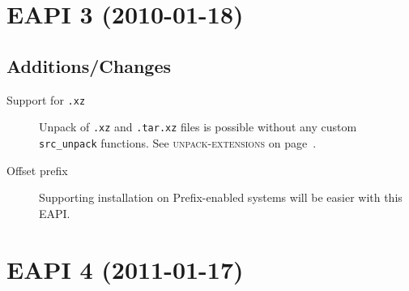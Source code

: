 \documentclass[a4paper,nofoldmark]{leaflet}
\newcommand{\code}[1]{\texttt{#1}}
\newcommand{\featureref}[1]{\textsc{#1} on page~\pageref{feat:#1}}
\begin{document}

\section{EAPI 3 (2010-01-18)}
\label{sec:cs:eapi3}
\subsection{Additions/Changes}
\label{sec:cs:eapi3-additions}
\begin{description}
    \item[Support for \code{.xz}] Unpack of \code{.xz} and
    \code{.tar.xz} files is possible without any custom
    \code{src_unpack} functions.  See \featureref{unpack-extensions}.
    \item[Offset prefix] Supporting installation on Prefix-enabled
    systems will be easier with this EAPI.
\end{description}

\section{EAPI 4 (2011-01-17)}
\label{sec:cs:eapi4}
\end{document}
